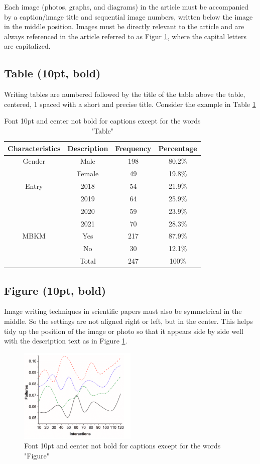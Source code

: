 \documentclass{article}
\begin{document}
Each image (photos, graphs, and diagrams) in the article must be accompanied by a caption/image title and sequential image numbers, written below the image in the middle position. Images must be directly relevant to the article and are always referenced in the article referred to as Figur \ref{table1}, where the capital letters are capitalized.

\subsection{Table (10pt, bold)}
Writing tables are numbered followed by the title of the table above the table, centered, 1 spaced with a short and precise title. Consider the example in Table \ref{table1}
\begin{table}[h]
	\centering
	\caption{Font 10pt and center not bold for captions except for the words "Table"}
	\label{table1}
	\begin{tabular}{@{}cccc@{}}
		\toprule
		\textbf{Characteristics}& \textbf{Description }& \textbf{Frequency }& \textbf{Percentage} \\
		\midrule
		Gender & Male & 198 & 80.2\% \\
		& Female & 49 & 19.8\% \\
		Entry & 2018 & 54 & 21.9\% \\
		& 2019 & 64 & 25.9\% \\
		& 2020 & 59 & 23.9\% \\
		& 2021 & 70 & 28.3\% \\
		MBKM & Yes & 217 & 87.9\% \\
		& No & 30 & 12.1\% \\
		& Total & 247 & 100\% \\
		\bottomrule
	\end{tabular}
\end{table}


\subsection{Figure (10pt, bold)}
Image writing techniques in scientific papers must also be symmetrical in the middle. So the settings are not aligned right or left, but in the center. This helps tidy up the position of the image or photo so that it appears side by side well with the description text as in Figure \ref{fig2}.

\begin{figure}[h]
	\centering
	\includegraphics[width=0.5\textwidth]{images/figur2.PNG}
	\caption{Font 10pt and center not bold for captions except for the words "Figure"  }
	\label{fig2}
\end{figure}
\end{document}
